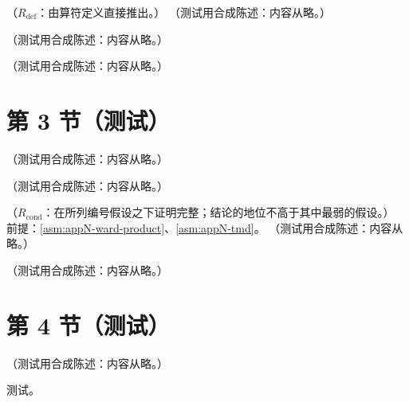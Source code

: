 \begin{lemma}\label{lem:tmd-sqrt-identity}
（$R_{\mathrm{def}}$：由算符定义直接推出。）
（测试用合成陈述：内容从略。）
\end{lemma}

\begin{definition}\label{def:tmd-collins}
（测试用合成陈述：内容从略。）
\end{definition}

\begin{remark}[其他方案]\label{rem:tmd-schemes}
（测试用合成陈述：内容从略。）
\end{remark}

\section{第 3 节（测试）}\label{sec:tmd-definitions}

\begin{remark}\label{rem:tmd-scheme-constants}
（测试用合成陈述：内容从略。）
\end{remark}

\begin{remark}[极限次序]\label{rem:tmd-order-of-limits}
（测试用合成陈述：内容从略。）
\end{remark}

\begin{proposition}\label{prop:tmd-zero-bin-soft}
（$R_{\mathrm{cond}}$：在所列编号假设之下证明完整；结论的地位不高于其中最弱的假设。）
前提：\cref{asm:appN-ward-product}、\cref{asm:appN-tmd}。
（测试用合成陈述：内容从略。）
\end{proposition}

\begin{remark}[快度窗口]\label{rem:tmd-rapidity-window}
（测试用合成陈述：内容从略。）
\end{remark}

\section{第 4 节（测试）}\label{sec:tmd-subtraction}

\begin{lemma}\label{lem:tmd-glauber}
（测试用合成陈述：内容从略。）
\end{lemma}
\begin{proofsketch}测试。\end{proofsketch}
